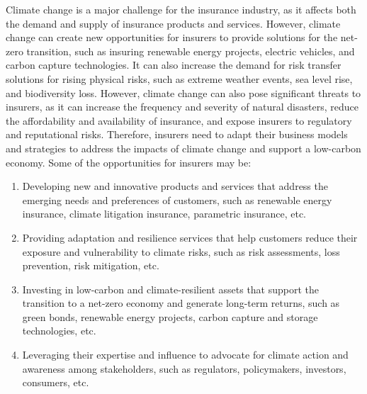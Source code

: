 \documentclass[a4paper,12pt]{article}
\begin{document}
Climate change is a major challenge for the insurance industry, as it affects both the demand and supply of insurance products and services. However, climate change can create new opportunities for insurers to provide solutions for the net-zero transition, such as insuring renewable energy projects, electric vehicles, and carbon capture technologies. It can also increase the demand for risk transfer solutions for rising physical risks, such as extreme weather events, sea level rise, and biodiversity loss. However, climate change can also pose significant threats to insurers, as it can increase the frequency and severity of natural disasters, reduce the affordability and availability of insurance, and expose insurers to regulatory and reputational risks. Therefore, insurers need to adapt their business models and strategies to address the impacts of climate change and support a low-carbon economy. Some of the opportunities for insurers may be:
\begin{enumerate}
    \item Developing new and innovative products and services that address the emerging needs and preferences of customers, such as renewable energy insurance, climate litigation insurance, parametric insurance, etc.
    \item Providing adaptation and resilience services that help customers reduce their exposure and vulnerability to climate risks, such as risk assessments, loss prevention, risk mitigation, etc.
    \item Investing in low-carbon and climate-resilient assets that support the transition to a net-zero economy and generate long-term returns, such as green bonds, renewable energy projects, carbon capture and storage technologies, etc.
    \item Leveraging their expertise and influence to advocate for climate action and awareness among stakeholders, such as regulators, policymakers, investors, consumers, etc.
\end{enumerate}
\nocite{*}
\appendix
\printbibliography
\end{document}
